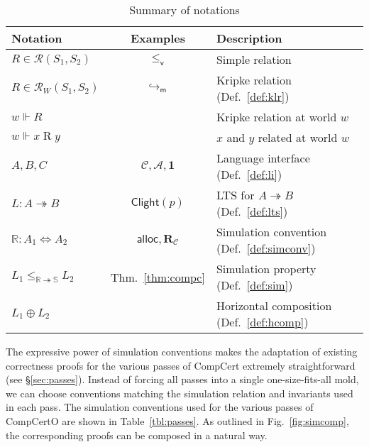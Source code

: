 \documentclass[acmsmall,authordraft]{acmart}
\newcommand{\kw}[1]{\ensuremath{ \mathsf{#1} }}
\newcommand{\que}{\circ}
\newcommand{\ans}{\bullet}
\newcommand{\vref}{\le_\kw{v}}
\begin{document}
\begin{table} %
  \begin{tabular}{lcl}
    \hline
    Notation & Examples & Description \\
    \hline
    $R \in \mathcal{R}(S_1, S_2)$ &
      $\vref$ &
      Simple relation \\
    $R \in \mathcal{R}_W(S_1, S_2)$ &
      $\hookrightarrow_\kw{m}$ &
      Kripke relation (Def.~\ref{def:klr}) \\
    $w \Vdash R$ & &
      Kripke relation at world $w$ \\
    $w \Vdash x \mathrel{R} y$ & &
      $x$ and $y$ related at world $w$ \\
    \hline
    $A, B, C$ &
      $\mathcal{C}, \mathcal{A}, \mathbf{1}$ &
      Language interface (Def.~\ref{def:li}) \\
    $L : A \twoheadrightarrow B$ &
      $\kw{Clight}(p)$ &
      LTS for $A \twoheadrightarrow B$ (Def.~\ref{def:lts}) \\
    $\mathbb{R} : A_1 \Leftrightarrow A_2$ &
      $\kw{alloc}, \mathbf{R}_\mathcal{C}$ &
      Simulation convention (Def.~\ref{def:simconv}) \\
    $L_1 \le_{\mathbb{R} \twoheadrightarrow \mathbb{S}} L_2$ &
      Thm.~\ref{thm:compc} &
      Simulation property (Def.~\ref{def:sim}) \\
    $L_1 \oplus L_2$ & &
      Horizontal composition (Def.~\ref{def:hcomp}) \\
    \hline
  \end{tabular}
  \caption{Summary of notations}
  \label{tbl:notations}
\end{table}

The expressive power of simulation conventions
makes the adaptation of existing correctness proofs
for the various passes of CompCert
extremely straightforward (see \S\ref{sec:passes}).
Instead of forcing all passes into a single one-size-fits-all mold,
we can choose conventions matching
the simulation relation and invariants
used in each pass.
The simulation conventions
used for the various passes of CompCertO
are shown in Table~\ref{tbl:passes}.
As outlined in Fig.~\ref{fig:simcomp},
the corresponding proofs can be composed in a natural way.
\end{document}
